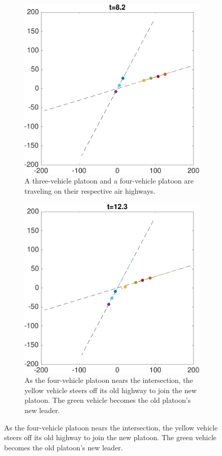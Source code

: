 \begin{figure}
    \centering
    \begin{subfigure}[t]{0.23\textwidth} \label{subfig:ch_83}
        \includegraphics[width=\textwidth]{fig/ch_83}
        \caption{A three-vehicle platoon and a four-vehicle platoon are traveling on their respective air highways.}
    \end{subfigure}
    \begin{subfigure}[t]{0.23\textwidth} \label{subfig:ch_124}
        \includegraphics[width=\textwidth]{fig/ch_124}
        \caption{As the four-vehicle platoon nears the intersection, the yellow vehicle steers off its old highway to join the new platoon. The green vehicle becomes the old platoon's new leader.}
    \end{subfigure}


\end{figure}
